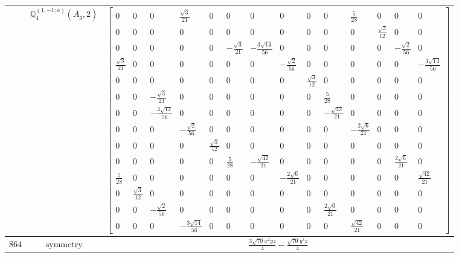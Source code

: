\documentclass[fleqn,8pt,landscape]{jsarticle}
\begin{document}
\begin{longtable}{ccc}
$  $ & $ \mathbb{Q}_{4}^{(1,-1;a)}(A_{g},2) $ & $ \begin{bmatrix} 0 & 0 & 0 & \frac{\sqrt{3}}{21} & 0 & 0 & 0 & 0 & 0 & 0 & \frac{5}{28} & 0 & 0 & 0 \\ 0 & 0 & 0 & 0 & 0 & 0 & 0 & 0 & 0 & 0 & 0 & \frac{\sqrt{3}}{12} & 0 & 0 \\ 0 & 0 & 0 & 0 & 0 & - \frac{\sqrt{3}}{21} & - \frac{3 \sqrt{14}}{56} & 0 & 0 & 0 & 0 & 0 & - \frac{\sqrt{2}}{56} & 0 \\ \frac{\sqrt{3}}{21} & 0 & 0 & 0 & 0 & 0 & 0 & - \frac{\sqrt{2}}{56} & 0 & 0 & 0 & 0 & 0 & - \frac{3 \sqrt{14}}{56} \\ 0 & 0 & 0 & 0 & 0 & 0 & 0 & 0 & \frac{\sqrt{3}}{12} & 0 & 0 & 0 & 0 & 0 \\ 0 & 0 & - \frac{\sqrt{3}}{21} & 0 & 0 & 0 & 0 & 0 & 0 & \frac{5}{28} & 0 & 0 & 0 & 0 \\ 0 & 0 & - \frac{3 \sqrt{14}}{56} & 0 & 0 & 0 & 0 & 0 & 0 & - \frac{\sqrt{42}}{21} & 0 & 0 & 0 & 0 \\ 0 & 0 & 0 & - \frac{\sqrt{2}}{56} & 0 & 0 & 0 & 0 & 0 & 0 & - \frac{2 \sqrt{6}}{21} & 0 & 0 & 0 \\ 0 & 0 & 0 & 0 & \frac{\sqrt{3}}{12} & 0 & 0 & 0 & 0 & 0 & 0 & 0 & 0 & 0 \\ 0 & 0 & 0 & 0 & 0 & \frac{5}{28} & - \frac{\sqrt{42}}{21} & 0 & 0 & 0 & 0 & 0 & \frac{2 \sqrt{6}}{21} & 0 \\ \frac{5}{28} & 0 & 0 & 0 & 0 & 0 & 0 & - \frac{2 \sqrt{6}}{21} & 0 & 0 & 0 & 0 & 0 & \frac{\sqrt{42}}{21} \\ 0 & \frac{\sqrt{3}}{12} & 0 & 0 & 0 & 0 & 0 & 0 & 0 & 0 & 0 & 0 & 0 & 0 \\ 0 & 0 & - \frac{\sqrt{2}}{56} & 0 & 0 & 0 & 0 & 0 & 0 & \frac{2 \sqrt{6}}{21} & 0 & 0 & 0 & 0 \\ 0 & 0 & 0 & - \frac{3 \sqrt{14}}{56} & 0 & 0 & 0 & 0 & 0 & 0 & \frac{\sqrt{42}}{21} & 0 & 0 & 0 \end{bmatrix} $ \\ \hline
$ 864 $ & $ \text{symmetry} $ & $ \frac{3 \sqrt{70} x^{2} y z}{4} - \frac{\sqrt{70} y^{3} z}{4} $ \\

\end{longtable}
\end{document}
